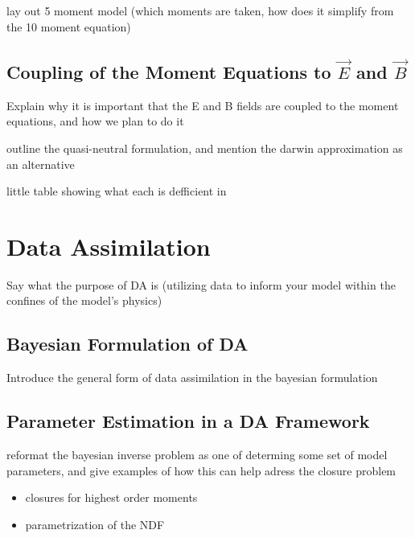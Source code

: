\documentclass[titlepage,12pt,letterpaper]{article}
\begin{document}
lay out 5 moment model (which moments are taken, how does it simplify from the 10 moment equation)


\subsection{Coupling of the Moment Equations to $\vec{E}$ and $\vec{B}$}\label{plasma:coupleing_to_E_and_B}

Explain why it is important that the E and B fields are coupled to the moment equations, and how we plan to do it

outline the quasi-neutral formulation, and mention the darwin approximation as an alternative

little table showing what each is defficient in



\section{Data Assimilation}\label{DA}

Say what the purpose of DA is (utilizing data to inform your model within the confines of the model's physics)


\subsection{Bayesian Formulation of DA}\label{DA:bayesian}

Introduce the general form of data assimilation in the bayesian formulation


\subsection{Parameter Estimation in a DA Framework}\label{DA:parameter_estimation}

reformat the bayesian inverse problem as one of determing some set of model parameters, and give examples of how this can help adress the closure problem

\begin{itemize}
  \item closures for highest order moments
  \item parametrization of the NDF
\end{itemize}
\end{document}
